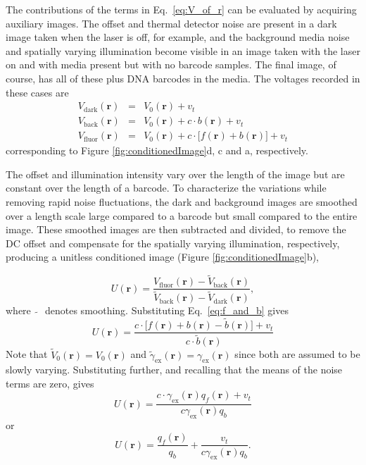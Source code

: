 The contributions of the terms in Eq.~\ref{eq:V_of_r} can be evaluated by acquiring auxiliary images. The offset and thermal detector noise are present in a dark image taken when the laser is off, for example, and the background media noise and spatially varying illumination become visible in an image taken with the laser on and with media present but with no barcode samples. The final image, of course, has all of these plus DNA barcodes in the media. The voltages recorded in these cases are
\begin{eqnarray}
V_{\text{dark}}(\mathbf{r})&=&V_0(\mathbf{r})+v_t\\
V_{\text{back}}(\mathbf{r})&=&V_0(\mathbf{r})+c \cdot  b(\mathbf{r})  +v_t\\
V_{\text{fluor}}(\mathbf{r})&=&V_0(\mathbf{r})+c \cdot \big[ f(\mathbf{r}) + b(\mathbf{r})\big]  +v_t
\end{eqnarray}
corresponding to Figure \ref{fig:conditionedImage}d, c and a, respectively. 

The offset and illumination intensity vary over the length of the image but are constant over the length of a barcode. To characterize the variations while removing rapid noise fluctuations, the dark and background images are smoothed over a length scale large compared to a barcode but small compared to the entire image. These smoothed images are then subtracted and divided, to remove the DC offset and compensate for the spatially varying illumination, respectively, producing a unitless conditioned image (Figure \ref{fig:conditionedImage}b),

\begin{equation}
U(\mathbf{r})= \frac{ V_{\text{fluor}}(\mathbf{r}) - \widetilde{V}_{\text{back}}(\mathbf{r})  }{ \widetilde{V}_{\text{back}}(\mathbf{r}) - \widetilde{V}_{\text{dark}}(\mathbf{r})} ,
\end{equation}
where~$\widetilde{~~}$~denotes smoothing. Substituting Eq.~\ref{eq:f_and_b} gives
\begin{equation}
U(\mathbf{r})= \frac{ c \cdot \big[ f(\mathbf{r})  +b(\mathbf{r}) -\widetilde{b}(\mathbf{r}) \big]+ v_t  }{   c \cdot \widetilde{b}(\mathbf{r}) }
\end{equation}
Note that $\widetilde{V}_0(\mathbf{r}) = V_0(\mathbf{r})$ and $\widetilde{\gamma}_{\text{ex}}(\mathbf{r})  = \gamma_{\text{ex}}(\mathbf{r})$ since both are assumed to be slowly varying. Substituting further, and recalling that the means of the noise terms are zero, gives
\begin{equation}
U(\mathbf{r})= \frac{ c \cdot \gamma_{\text{ex}}(\mathbf{r}) q_f(\mathbf{r})  + v_t  }{ c \gamma_{\text{ex}}(\mathbf{r})  q_b }
\end{equation}
or
\begin{equation}\label{eq:realDeal}
U(\mathbf{r})= \frac{ q_f(\mathbf{r}) }{ q_b}   + \frac{ v_t }{   c \gamma_{\text{ex}}(\mathbf{r}) q_b}.
\end{equation}



